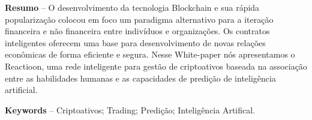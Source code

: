 \documentclass[
	article,			%
	12pt,				%
	oneside,			%
	a4paper,			%
	brazil,				%
	english,
	sumario=tradicional
	]{abntex2}
\begin{document}
\textual

\pagestyle{meuestilo}

\frenchspacing 

\maketitle

\thispagestyle{meuestilo}

\begin{changemargin}{1cm}{1cm} 
 \textbf{Resumo} – O desenvolvimento da tecnologia Blockchain e sua rápida popularização colocou em foco um paradigma alternativo para a iteração financeira e não financeira entre indivíduos e organizações. Os contratos inteligentes oferecem uma base para desenvolvimento de novas relações econômicas de forma eficiente e segura. Nesse White-paper nós apresentamos o Reactioon, uma rede inteligente para gestão de criptoativos baseada na associação entre as habilidades humanas e as capacidades de predição de inteligência artificial.
 
 

 \vspace{\onelineskip}
 
 \noindent
 \textbf{Keywords} – Criptoativos; Trading; Predição; Inteligência Artifical. 
\end{changemargin}

\end{document}
